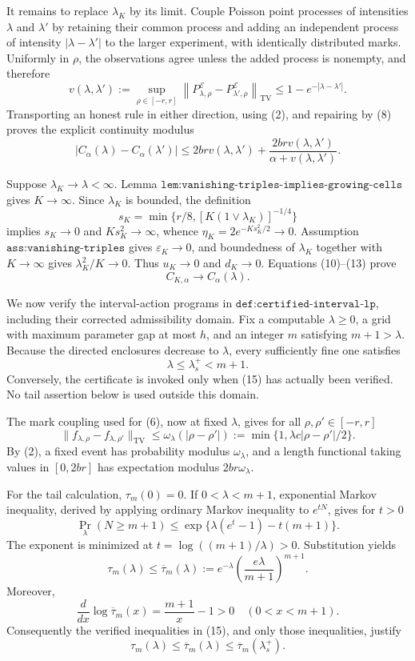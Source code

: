 It remains to replace \(\lambda_K\) by its limit.  Couple Poisson point
processes of intensities \(\lambda\) and \(\lambda'\) by retaining their
common process and adding an independent process of intensity
\(|\lambda-\lambda'|\) to the larger experiment, with identically
distributed marks.  Uniformly in \(\rho\), the observations agree unless
the added process is nonempty, and therefore
\[
 v(\lambda,\lambda')
 :=\sup_{\rho\in[-r,r]}
 \left\lVert P^{\mathcal E}_{\lambda,\rho}
 -P^{\mathcal E}_{\lambda',\rho}\right\rVert_{\mathrm{TV}}
 \leq1-e^{-|\lambda-\lambda'|}.
 \tag{12}
\]
Transporting an honest rule in either direction, using (2), and repairing
by (8) proves the explicit continuity modulus
\[
 |C_\alpha(\lambda)-C_\alpha(\lambda')|
 \leq2brv(\lambda,\lambda')
 +\frac{2brv(\lambda,\lambda')}{\alpha+v(\lambda,\lambda')}.
 \tag{13}
\]

Suppose \(\lambda_K\to\lambda<\infty\).  Lemma
\(\texttt{lem:vanishing-triples-implies-growing-cells}\) gives
\(K\to\infty\).  Since \(\lambda_K\) is bounded, the definition
\[
 s_K=\min\{r/8,[K(1\vee\lambda_K)]^{-1/4}\}
\]
implies \(s_K\to0\) and \(Ks_K^2\to\infty\), whence
\(\eta_K=2e^{-Ks_K^2/2}\to0\).  Assumption
\(\texttt{ass:vanishing-triples}\) gives \(\varepsilon_K\to0\), and
boundedness of \(\lambda_K\) together with \(K\to\infty\) gives
\(\lambda_K^2/K\to0\).  Thus \(u_K\to0\) and \(d_K\to0\).  Equations
(10)--(13) prove
\[
 C_{K,\alpha}\longrightarrow C_\alpha(\lambda).
 \tag{14}
\]

We now verify the interval-action programs in
\(\texttt{def:certified-interval-lp}\), including their corrected
admissibility domain.  Fix a computable \(\lambda\geq0\), a grid with
maximum parameter gap at most \(h\), and an integer \(m\) satisfying
\(m+1>\lambda\).  Because the directed enclosures decrease to
\(\lambda\), every sufficiently fine one satisfies
\[
 \lambda\leq\lambda_s^+<m+1.
 \tag{15}
\]
Conversely, the certificate is invoked only when (15) has actually been
verified.  No tail assertion below is used outside this domain.

The mark coupling used for (6), now at fixed \(\lambda\), gives for all
\(\rho,\rho'\in[-r,r]\)
\[
 \lVert f_{\lambda,\rho}-f_{\lambda,\rho'}\rVert_{\mathrm{TV}}
 \leq\omega_\lambda(|\rho-\rho'|)
 :=\min\{1,\lambda c|\rho-\rho'|/2\}.
 \tag{16}
\]
By (2), a fixed event has probability modulus \(\omega_\lambda\), and a
length functional taking values in \([0,2br]\) has expectation modulus
\(2br\omega_\lambda\).

For the tail calculation, \(\tau_m(0)=0\).  If
\(0<\lambda<m+1\), exponential Markov inequality, derived by applying
ordinary Markov inequality to \(e^{tN}\), gives for \(t>0\)
\[
 \Pr_\lambda(N\geq m+1)
 \leq\exp\{\lambda(e^t-1)-t(m+1)\}.
 \tag{17}
\]
The exponent is minimized at
\(t=\log((m+1)/\lambda)>0\).  Substitution yields
\[
 \tau_m(\lambda)
 \leq\overline\tau_m(\lambda)
 :=e^{-\lambda}\left(\frac{e\lambda}{m+1}\right)^{m+1}.
 \tag{18}
\]
Moreover,
\[
 \frac{d}{dx}\log\overline\tau_m(x)=\frac{m+1}{x}-1>0
 \quad(0<x<m+1).
 \tag{19}
\]
Consequently the verified inequalities in (15), and only those
inequalities, justify
\[
 \tau_m(\lambda)
 \leq\overline\tau_m(\lambda)
 \leq\overline\tau_m(\lambda_s^+).
 \tag{20}
\]

